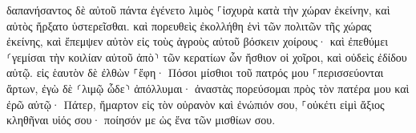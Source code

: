 \documentclass{openreader}
\begin{document}
δαπανήσαντος δὲ αὐτοῦ πάντα ἐγένετο λιμὸς ⸀ἰσχυρὰ κατὰ τὴν χώραν ἐκείνην, καὶ αὐτὸς ἤρξατο ὑστερεῖσθαι. 
καὶ πορευθεὶς ἐκολλήθη ἑνὶ τῶν πολιτῶν τῆς χώρας ἐκείνης, καὶ ἔπεμψεν αὐτὸν εἰς τοὺς ἀγροὺς αὐτοῦ βόσκειν χοίρους· 
καὶ ἐπεθύμει ⸂γεμίσαι τὴν κοιλίαν αὐτοῦ ἀπὸ⸃ τῶν κερατίων ὧν ἤσθιον οἱ χοῖροι, καὶ οὐδεὶς ἐδίδου αὐτῷ. 
εἰς ἑαυτὸν δὲ ἐλθὼν ⸀ἔφη· Πόσοι μίσθιοι τοῦ πατρός μου ⸀περισσεύονται ἄρτων, ἐγὼ δὲ ⸂λιμῷ ὧδε⸃ ἀπόλλυμαι· 
ἀναστὰς πορεύσομαι πρὸς τὸν πατέρα μου καὶ ἐρῶ αὐτῷ· Πάτερ, ἥμαρτον εἰς τὸν οὐρανὸν καὶ ἐνώπιόν σου, 
⸀οὐκέτι εἰμὶ ἄξιος κληθῆναι υἱός σου· ποίησόν με ὡς ἕνα τῶν μισθίων σου. 
\end{document}
